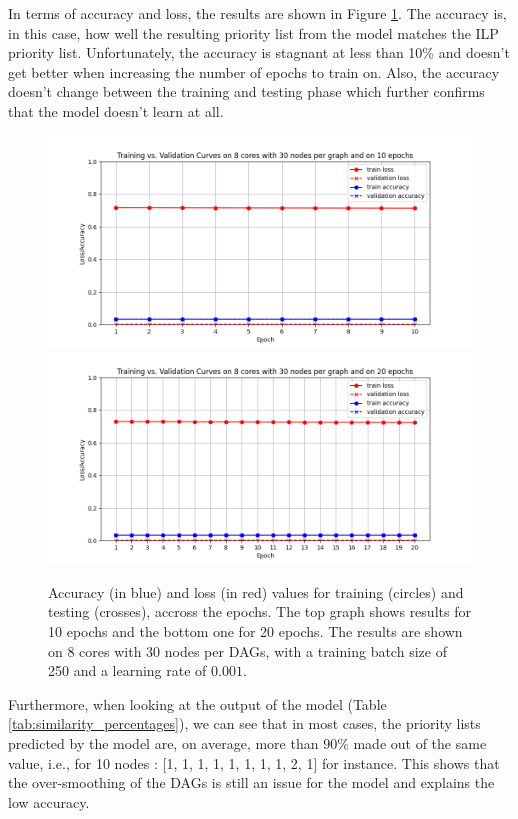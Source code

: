 In terms of accuracy and loss, the results are shown in Figure \ref{fig:accu_loss_model}.
The accuracy is, in this case, how well the resulting priority list 
from the model matches the ILP priority list.
Unfortunately, the accuracy is stagnant at less than 10\%
and doesn't get better when increasing the number of epochs to train on. 
Also, the accuracy doesn't change between the training and testing phase
which further confirms that the model doesn't learn at all.

\begin{figure}
    \centering
    \includegraphics[width=\linewidth]{images/train_val_curves_m8n30epo10.png}
    \includegraphics[width=\linewidth]{images/train_val_curves_m8n30epo20.png}
    \caption{Accuracy (in blue) and loss (in red) values for training (circles) and testing (crosses),
    accross the epochs. The top graph shows results for 10 epochs
    and the bottom one for 20 epochs. The results are shown on 8 cores with 30 nodes per DAGs,
    with a training batch size of 250 and a learning rate of $0.001$.}
    \label{fig:accu_loss_model}
\end{figure}

Furthermore,
when looking at the output of the model (Table \ref{tab:similarity_percentages}),
we can see that in most cases,
the priority lists predicted by the model are, on average, more than 90\% 
made out of the same value, i.e., for 10 nodes : [1, 1, 1, 1, 1, 1, 1, 1, 2, 1] for instance.
This shows that the over-smoothing of the DAGs is still an issue for the model and explains
the low accuracy.

